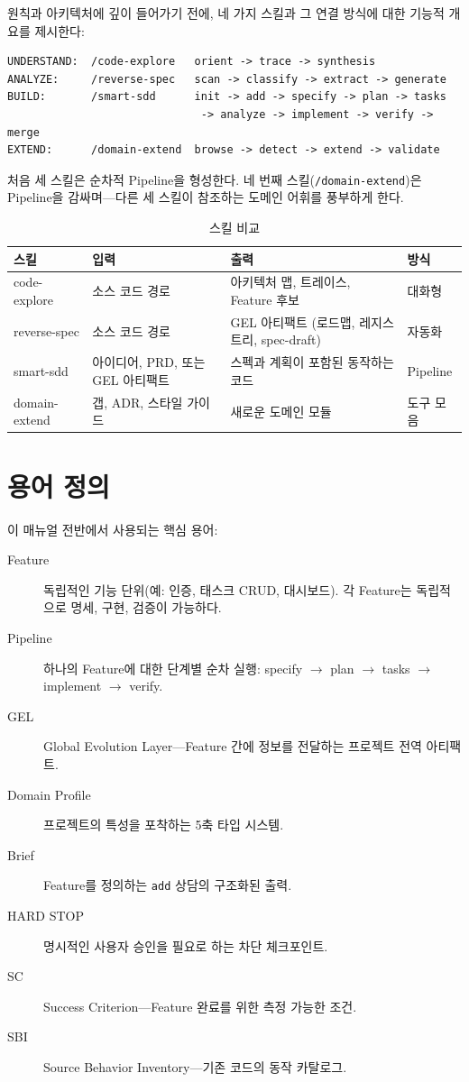 \documentclass[11pt,a4paper,openright,twoside]{report}
\newcommand{\cmd}[1]{\texttt{/#1}}
\begin{document}
원칙과 아키텍처에 깊이 들어가기 전에, 네 가지 스킬과 그 연결 방식에 대한 기능적 개요를 제시한다:

\begin{lstlisting}[title={The Four Skills Pipeline}]
UNDERSTAND:  /code-explore   orient -> trace -> synthesis
ANALYZE:     /reverse-spec   scan -> classify -> extract -> generate
BUILD:       /smart-sdd      init -> add -> specify -> plan -> tasks
                              -> analyze -> implement -> verify -> merge
EXTEND:      /domain-extend  browse -> detect -> extend -> validate
\end{lstlisting}

처음 세 스킬은 순차적 Pipeline을 형성한다. 네 번째 스킬(\cmd{domain-extend})은 Pipeline을 감싸며---다른 세 스킬이 참조하는 도메인 어휘를 풍부하게 한다.

\begin{table}[H]
\centering
\caption{스킬 비교}
\label{tab:skill-comparison}
\begin{tabularx}{\textwidth}{lXXl}
\toprule
\textbf{스킬} & \textbf{입력} & \textbf{출력} & \textbf{방식} \\
\midrule
code-explore & 소스 코드 경로 & 아키텍처 맵, 트레이스, Feature 후보 & 대화형 \\
reverse-spec & 소스 코드 경로 & GEL 아티팩트 (로드맵, 레지스트리, spec-draft) & 자동화 \\
smart-sdd & 아이디어, PRD, 또는 GEL 아티팩트 & 스펙과 계획이 포함된 동작하는 코드 & Pipeline \\
domain-extend & 갭, ADR, 스타일 가이드 & 새로운 도메인 모듈 & 도구 모음 \\
\bottomrule
\end{tabularx}
\end{table}

\section{용어 정의}

이 매뉴얼 전반에서 사용되는 핵심 용어:

\begin{description}
  \item[Feature] 독립적인 기능 단위(예: 인증, 태스크 CRUD, 대시보드). 각 Feature는 독립적으로 명세, 구현, 검증이 가능하다.
  \item[Pipeline] 하나의 Feature에 대한 단계별 순차 실행: specify $\rightarrow$ plan $\rightarrow$ tasks $\rightarrow$ implement $\rightarrow$ verify.
  \item[GEL] Global Evolution Layer---Feature 간에 정보를 전달하는 프로젝트 전역 아티팩트.
  \item[Domain Profile] 프로젝트의 특성을 포착하는 5축 타입 시스템.
  \item[Brief] Feature를 정의하는 \texttt{add} 상담의 구조화된 출력.
  \item[HARD STOP] 명시적인 사용자 승인을 필요로 하는 차단 체크포인트.
  \item[SC] Success Criterion---Feature 완료를 위한 측정 가능한 조건.
  \item[SBI] Source Behavior Inventory---기존 코드의 동작 카탈로그.
\end{description}
\end{document}
